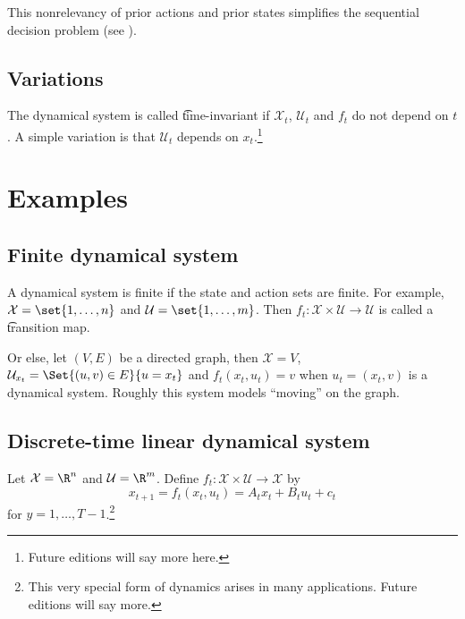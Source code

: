 This nonrelevancy of prior actions and prior states simplifies the sequential decision problem (see ).

\subsection*{Variations}

The dynamical system is called \t{time-invariant} if $\mathcal{X} _{t}$, $\mathcal{U} _t$ and $f_t$ do not depend on $t$.
A simple variation is that $\mathcal{U} _t$ depends on $x_t$.\footnote{Future editions will say more here.}

\section*{Examples}

\subsection*{Finite dynamical system}

A dynamical system is finite if the state and action sets are finite.
For example, $\mathcal{X}  = \set{1, \dots , n}$ and $\mathcal{U}  = \set{1, \dots , m}$.
Then $f_t: \mathcal{X}  \times  \mathcal{U}  \to \mathcal{U} $ is called a \t{transition map}.

Or else, let $(V, E)$ be a directed graph, then $\mathcal{X} = V$, $\mathcal{U} _{x_t} = \Set{(u, v) \in E}{u = x_t}$ and $f_t(x_t, u_t) = v$ when $u_t = (x_t, v)$ is a dynamical system.
Roughly this system models ``moving'' on the graph.

\subsection*{Discrete-time linear dynamical system}

Let $\mathcal{X}  = \R ^n$ and $\mathcal{U}  = \R ^m$.
Define $f_t: \mathcal{X}  \times  \mathcal{U}  \to \mathcal{X} $ by
\[
x_{t+1} = f_t(x_t, u_t) = A_t x_t + B_t u_t + c_t
\]
for $y = 1, \dots , T-1$.\footnote{This very special form of dynamics arises in many applications. Future editions will say more.}
